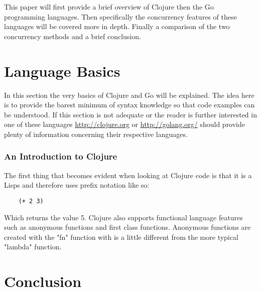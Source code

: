 \documentclass{acm_proc_article-sp}
\begin{document}
	This paper will first provide a brief overview of Clojure then the Go programming languages. Then specifically the concurrency features of these languages will be covered more in depth. Finally a comparison of the two concurrency methods and a brief conclusion.
	
\section{Language Basics}
	In this section the very basics of Clojure and Go will be explained. The idea here is to provide the barest minimum of syntax knowledge so that code examples can be understood. If this section is not adequate or the reader is further interested in one of these languages \url{http://clojure.org} or \url{http://golang.org/} should provide plenty of information concerning their respective languages.
	
\subsubsection{An Introduction to Clojure}
	The first thing that becomes evident when looking at Clojure code is that it is a Lisps and therefore uses prefix notation like so:
	\begin{verbatim}
	(+ 2 3)
	\end{verbatim}
	Which returns the value 5. Clojure also supports functional language features such as anonymous functions and first class functions. Anonymous functions are created with the "fn" function with is a little different from the more typical "lambda" function. 
\section{Conclusion}



\end{document}
